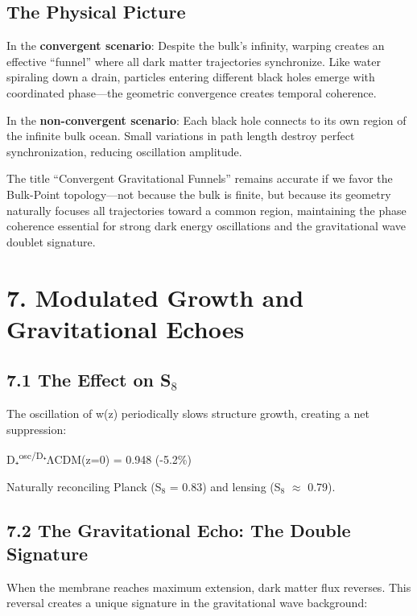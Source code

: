 \documentclass[
  11pt,
]{report}
\begin{document}
\subsection{The Physical Picture}\label{the-physical-picture}

In the \textbf{convergent scenario}: Despite the bulk's infinity,
warping creates an effective ``funnel'' where all dark matter
trajectories synchronize. Like water spiraling down a drain, particles
entering different black holes emerge with coordinated phase---the
geometric convergence creates temporal coherence.

In the \textbf{non-convergent scenario}: Each black hole connects to its
own region of the infinite bulk ocean. Small variations in path length
destroy perfect synchronization, reducing oscillation amplitude.

The title ``Convergent Gravitational Funnels'' remains accurate if we
favor the Bulk-Point topology---not because the bulk is finite, but
because its geometry naturally focuses all trajectories toward a common
region, maintaining the phase coherence essential for strong dark energy
oscillations and the gravitational wave doublet signature.

\section{7. Modulated Growth and Gravitational
Echoes}\label{modulated-growth-and-gravitational-echoes}

\subsection{\texorpdfstring{7.1 The Effect on
S\(_8\)}{7.1 The Effect on S\_8}}\label{the-effect-on-s_8}

The oscillation of w(z) periodically slows structure growth, creating a
net suppression:

D₊\textsuperscript{osc/D₊}ΛCDM(z=0) = 0.948 (-5.2\%)

Naturally reconciling Planck (S\(_8\) = 0.83) and lensing (S\(_8\)
\(\approx\) 0.79).

\subsection{7.2 The Gravitational Echo: The Double
Signature}\label{the-gravitational-echo-the-double-signature}

When the membrane reaches maximum extension, dark matter flux reverses.
This reversal creates a unique signature in the gravitational wave
background:
\end{document}
